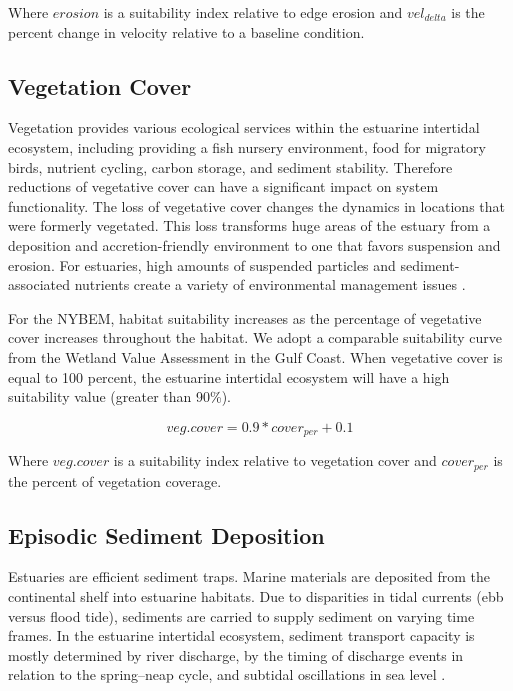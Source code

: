 \documentclass[
]{book}
\begin{document}
Where \(erosion\) is a suitability index relative to edge erosion and \(vel_{delta}\) is the percent change in velocity relative to a baseline condition.

\hypertarget{vegetation-cover-1}{%
\subsection{Vegetation Cover}\label{vegetation-cover-1}}

Vegetation provides various ecological services within the estuarine intertidal ecosystem, including providing a fish nursery environment, food for migratory birds, nutrient cycling, carbon storage, and sediment stability. Therefore reductions of vegetative cover can have a significant impact on system functionality. The loss of vegetative cover changes the dynamics in locations that were formerly vegetated. This loss transforms huge areas of the estuary from a deposition and accretion-friendly environment to one that favors suspension and erosion. For estuaries, high amounts of suspended particles and sediment-associated nutrients create a variety of environmental management issues \citep{cotton_effects_2006}.

For the NYBEM, habitat suitability increases as the percentage of vegetative cover increases throughout the habitat. We adopt a comparable suitability curve from the Wetland Value Assessment in the Gulf Coast. When vegetative cover is equal to 100 percent, the estuarine intertidal ecosystem will have a high suitability value (greater than 90\%).

\[veg.cover = 0.9*cover_{per}+0.1\]

Where \(veg.cover\) is a suitability index relative to vegetation cover and \(cover_{per}\) is the percent of vegetation coverage.

\hypertarget{episodic-sediment-deposition-1}{%
\subsection{Episodic Sediment Deposition}\label{episodic-sediment-deposition-1}}

Estuaries are efficient sediment traps. Marine materials are deposited from the continental shelf into estuarine habitats. Due to disparities in tidal currents (ebb versus flood tide), sediments are carried to supply sediment on varying time frames. In the estuarine intertidal ecosystem, sediment transport capacity is mostly determined by river discharge, by the timing of discharge events in relation to the spring--neap cycle, and subtidal oscillations in sea level \citep{prosser_impacts_2018}.
\end{document}
